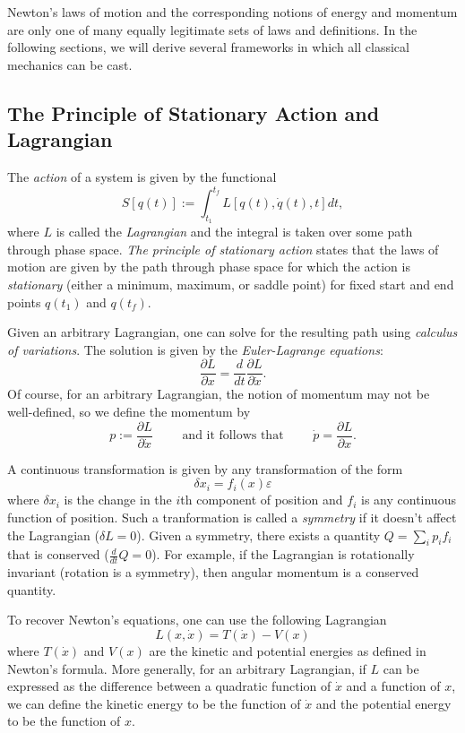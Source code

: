 \documentclass[12pt]{article}
\begin{document}
Newton's laws of motion and the corresponding notions of energy and momentum
are only one of many equally legitimate sets of laws and definitions.
In the following sections, we will derive several frameworks in which
all classical mechanics can be cast.

\subsection*{The Principle of Stationary Action and Lagrangian}

The {\it action} of a system is given by the functional
$$
S[q(t)] := \int_{t_1}^{t_f} L[q(t),\dot{q}(t),t] dt,
$$
where $L$ is called the {\it Lagrangian} and the integral is taken over
some path through phase space.
{\it The principle of stationary action} states that the laws of motion are
given by the path through phase space for which the action is {\it stationary} 
(either a minimum, maximum, or saddle point) for fixed start and end points
$q(t_1)$ and $q(t_f)$.

Given an arbitrary Lagrangian, one can solve for the resulting path using 
{\it calculus of variations}.
The solution is given by the {\it Euler-Lagrange equations}:
$$
\frac{\partial L}{\partial x}=\frac{d}{dt}\frac{\partial L}{\partial\dot{x}}.
$$
Of course, for an arbitrary Lagrangian, the notion of momentum may not
be well-defined, so we define the momentum by
$$
p := \frac{\partial L}{\partial \dot{x}} \qquad\text{ and it follows that } 
\qquad\dot{p} = \frac{\partial L}{\partial x}.
$$

A continuous transformation is given by any transformation of the form 
$$\delta x_i = f_i(x) \varepsilon$$
where $\delta x_i$ is the change in the $i$th component of position and $f_i$ is
any continuous function of position. 
Such a tranformation is called a {\it symmetry} if it doesn't affect the 
Lagrangian ($\delta L = 0$).
Given a symmetry, there exists a quantity $Q = \sum_i p_i f_i$ that
is conserved ($\frac{d}{dt}Q = 0$).
For example, if the Lagrangian is rotationally invariant (rotation
is a symmetry), then angular momentum is a conserved quantity.

To recover Newton's equations, one can use the following Lagrangian 
$$
L(x, \dot{x}) = T(\dot{x}) - V(x)
$$
where $T(\dot{x})$ and $V(x)$ are the kinetic and potential energies as defined
in Newton's formula.
More generally, for an arbitrary Lagrangian, if $L$ can be expressed as the
difference between a quadratic function of $\dot{x}$ and a function of $x$,
we can define the kinetic energy to be the function of $\dot{x}$ and the
potential energy to be the function of $x$.
\end{document}
